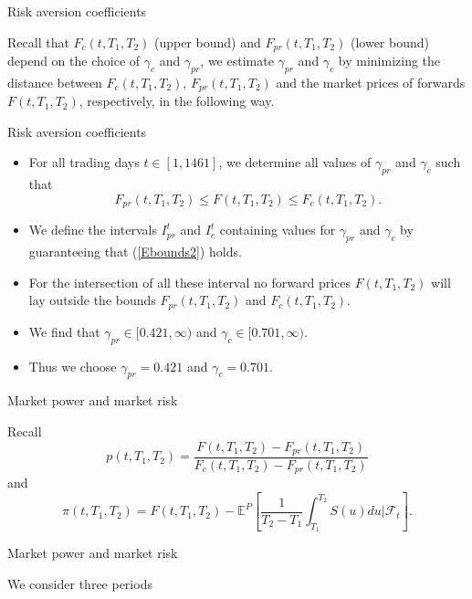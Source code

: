 {Risk aversion coefficients}

Recall that $F_c(t,T_1,T_2)$ (upper bound) and
$F_{pr}(t,T_1,T_2)$ (lower bound) depend on the choice of
$\gamma_{c}$ and $\gamma_{pr}$, we estimate $\gamma_{pr}$ and
$\gamma_{c}$ by minimizing the distance between $F_c(t,T_1,T_2)$,
$F_{pr}(t,T_1,T_2)$ and the market prices of forwards
$F(t,T_1,T_2)$, respectively, in the following way.



{Risk aversion coefficients}

\begin{itemize}
\item For all trading days $t\in[1,1461]$,  we determine all values of $\gamma_{pr}$ and $\gamma_c$
such that
\begin{equation}\label{Ebounds2}
F_{pr}(t,T_1,T_2)\leq F(t,T_1,T_2)\leq F_c(t,T_1,T_2).
\end{equation}
\item
We define the intervals
$I_{pr}^t$ and $I_{c}^t$ containing values for $\gamma_{pr}$ and
$\gamma_{c}$ by guaranteeing that (\ref{Ebounds2}) holds.
\item
For the intersection of all these interval no forward prices $F(t,T_1,T_2)$ will
lay outside the bounds $F_{pr}(t,T_1,T_2)$ and $F_{c}(t,T_1,T_2)$.
\item
We find that $\gamma_{pr}\in  [0.421,\infty)$
and $\gamma_{c}\in [0.701,\infty)$.
\item
Thus we choose $\gamma_{pr}=0.421$ and $\gamma_{c}=0.701$.
\end{itemize}



{Market power and market risk }

Recall
\[p(t,T_1,T_2)=\frac{F(t,T_1,T_2)-F_{pr}(t,T_1,T_2)}{F_c(t,T_1,T_2)-F_{pr}(t,T_1,T_2)}\]
 and
 \[\pi(t,T_1,T_2)=F(t,T_1,T_2)-\mathbb{E}^{P}\left[\frac{1}{T_2-T_1}\int_{T_1}^{T_2}S(u)du|\mathcal{F}_t\right].\]



{Market power and market risk }

We consider three periods

